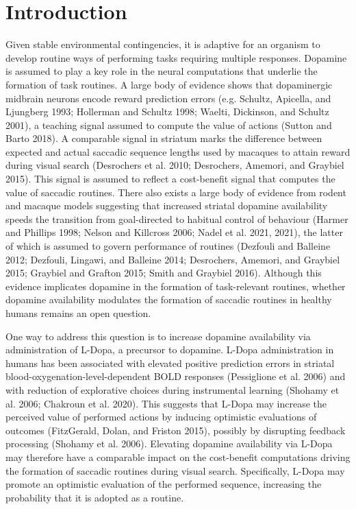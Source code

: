\documentclass{article}
\begin{document}
\hypertarget{introduction}{%
\section{Introduction}\label{introduction}}

Given stable environmental contingencies, it is adaptive for an organism
to develop routine ways of performing tasks requiring multiple
responses. Dopamine is assumed to play a key role in the neural
computations that underlie the formation of task routines. A large body
of evidence shows that dopaminergic midbrain neurons encode reward
prediction errors (e.g. Schultz, Apicella, and Ljungberg 1993; Hollerman
and Schultz 1998; Waelti, Dickinson, and Schultz 2001), a teaching
signal assumed to compute the value of actions (Sutton and Barto 2018).
A comparable signal in striatum marks the difference between expected
and actual saccadic sequence lengths used by macaques to attain reward
during visual search (Desrochers et al. 2010; Desrochers, Amemori, and
Graybiel 2015). This signal is assumed to reflect a cost-benefit signal
that computes the value of saccadic routines. There also exists a large
body of evidence from rodent and macaque models suggesting that
increased striatal dopamine availability speeds the transition from
goal-directed to habitual control of behaviour (Harmer and Phillips
1998; Nelson and Killcross 2006; Nadel et al. 2021, 2021), the latter of
which is assumed to govern performance of routines (Dezfouli and
Balleine 2012; Dezfouli, Lingawi, and Balleine 2014; Desrochers,
Amemori, and Graybiel 2015; Graybiel and Grafton 2015; Smith and
Graybiel 2016). Although this evidence implicates dopamine in the
formation of task-relevant routines, whether dopamine availability
modulates the formation of saccadic routines in healthy humans remains
an open question.

One way to address this question is to increase dopamine availability
via administration of L-Dopa, a precursor to dopamine. L-Dopa
administration in humans has been associated with elevated positive
prediction errors in striatal blood-oxygenation-level-dependent BOLD
responses (Pessiglione et al. 2006) and with reduction of explorative
choices during instrumental learning (Shohamy et al. 2006; Chakroun et
al. 2020). This suggests that L-Dopa may increase the perceived value of
performed actions by inducing optimistic evaluations of outcomes
(FitzGerald, Dolan, and Friston 2015), possibly by disrupting feedback
processing (Shohamy et al. 2006). Elevating dopamine availability via
L-Dopa may therefore have a comparable impact on the cost-benefit
computations driving the formation of saccadic routines during visual
search. Specifically, L-Dopa may promote an optimistic evaluation of the
performed sequence, increasing the probability that it is adopted as a
routine.
\end{document}
